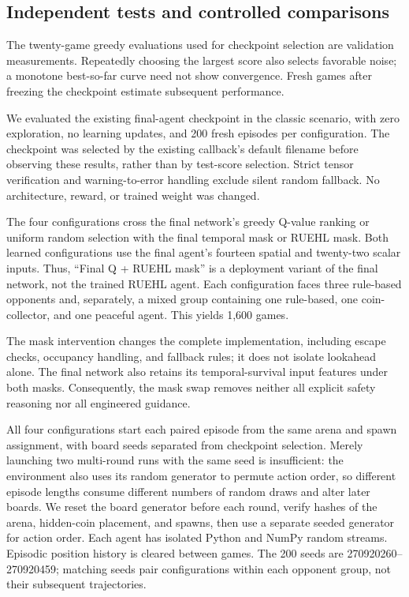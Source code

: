 \subsection{Independent tests and controlled comparisons}
The twenty-game greedy evaluations used for checkpoint selection are
validation measurements. Repeatedly choosing the largest score also selects
favorable noise; a monotone best-so-far curve need not show convergence.
Fresh games after freezing the checkpoint estimate subsequent performance.

We evaluated the existing final-agent checkpoint in the classic scenario,
with zero exploration, no learning updates, and 200 fresh episodes per
configuration. The checkpoint was selected by the existing callback's
default filename before observing these results, rather than by test-score selection. Strict tensor verification and
warning-to-error handling exclude silent random fallback. No architecture, reward,
or trained weight was changed.

The four configurations cross the final network's greedy Q-value ranking
or uniform random selection with the final temporal mask or RUEHL mask.
Both learned configurations use the final agent's fourteen spatial and
twenty-two scalar inputs. Thus, ``Final Q + RUEHL mask'' is a deployment
variant of the final network, not the trained RUEHL agent. Each configuration
faces three rule-based opponents and, separately, a mixed group containing
one rule-based, one coin-collector, and one peaceful agent. This yields
1,600 games.

The mask intervention changes the complete implementation, including
escape checks, occupancy handling, and fallback rules; it does not isolate
lookahead alone. The final network also retains its temporal-survival input
features under both masks. Consequently, the mask swap removes neither all
explicit safety reasoning nor all engineered guidance.

All four configurations start each paired episode from the same arena and spawn
assignment, with board seeds separated from checkpoint selection. Merely
launching two multi-round runs with the same seed is insufficient: the
environment also uses its random generator to permute action order, so
different episode lengths consume different numbers of random draws and
alter later boards. We reset the board generator before each round, verify
hashes of the arena, hidden-coin placement, and spawns, then use a separate
seeded generator for action order. Each agent has isolated Python and NumPy
random streams. Episodic position history is cleared between games. The
200 seeds are 270920260--270920459; matching seeds pair configurations
within each opponent group, not their subsequent trajectories.

